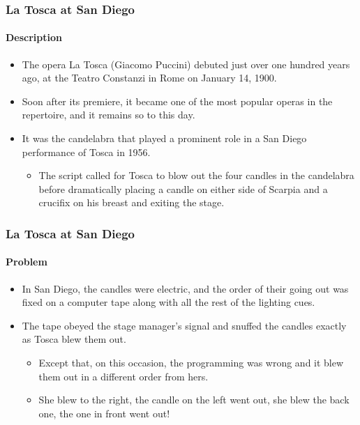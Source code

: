 \begin{frame}[hasprev=false, hasnext=true]
\label{example:la-tosca-at-san-diego}
\frametitle{La Tosca at San Diego}
\framesubtitle{Description}

\begin{itemize}
	\item The opera La Tosca (Giacomo Puccini) debuted just over one hundred
	years ago, at the Teatro Constanzi in Rome on January 14, 1900.

	\item Soon after its premiere, it became one of the most popular operas in
	the repertoire, and it remains so to this day.

	\item It was the candelabra that played a prominent role in a San Diego
	performance of Tosca in 1956.
	\begin{itemize}
		\item The script called for Tosca to blow out the four candles in the
		candelabra before dramatically placing a candle on either side of
		Scarpia and a crucifix on his breast and exiting the stage.
	\end{itemize}
\end{itemize}
\end{frame}


\begin{frame}[hasprev=true, hasnext=false]
\frametitle{La Tosca at San Diego}
\framesubtitle{Problem}

\begin{itemize}
	\item In San Diego, the candles were electric, and the order of their
	going out was fixed on a computer tape along with all the rest of the
	lighting cues.

	\item The tape obeyed the stage manager's signal and snuffed the
	candles exactly as Tosca blew them out.
	\begin{itemize}
		\item Except that, on this occasion, the programming was wrong and
		it blew them out in a different order from hers.

		\item She blew to the right, the candle on the left went out, she
		blew the back one, the one in front went out!
	\end{itemize}
\end{itemize}
\end{frame}

